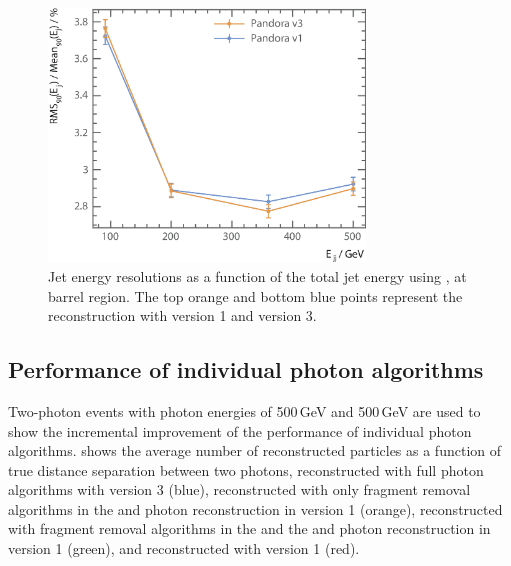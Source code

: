 
\begin{figure}[tbph]
\centering
\includegraphics[width=0.75\textwidth]{photon/JERnew2}
\caption[Jet energy resolution as a function of the di-jet energy]
{Jet energy resolutions as a function of the total jet energy using \eeZuds, at barrel region. The top orange and bottom blue points represent the  reconstruction with \pandora version 1 and version 3.}
\label{fig:photonJER}
\end{figure}


\subsection{Performance of individual photon algorithms}





Two-photon events with photon energies of  500\,GeV and 500\,GeV are  used to show the incremental improvement of the performance of individual photon algorithms.  shows the average number of reconstructed particles as a function of true distance separation between two photons, reconstructed with full photon algorithms with \pandora version 3 (blue), reconstructed with only fragment removal algorithms in the \ECAL and photon reconstruction in  \pandora version 1 (orange), reconstructed with fragment removal algorithms in the \ECAL and the \HCAL and photon reconstruction in  \pandora version 1 (green), and reconstructed with \pandora version 1 (red).

